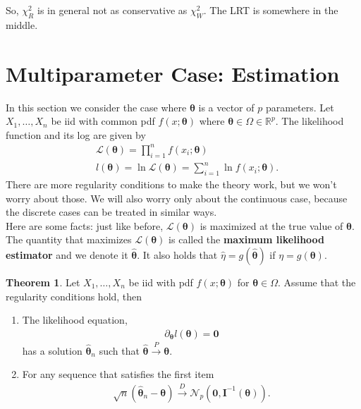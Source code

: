 \documentclass{book}
\theoremstyle{definition}
\newtheorem{thm}{Theorem}[section]
\newcommand{\p}{\partial}
\newcommand{\lag}{\mathcal{L}}
\newcommand{\N}{\mathcal{N}}
\begin{document}
So, $\chi^2_R$ is in general not as conservative as $\chi^2_W$. The LRT is somewhere in the middle. 










\section{Multiparameter Case: Estimation}


In this section we consider the case where $\bm{\theta}$ is a vector of $p$ parameters. Let $X_1,\dots, X_n$ be iid with common pdf $f(x;\bm\theta)$ where $\bm\theta \in \Omega \in \mathbb{R}^p$. The likelihood function and its log are given by
\begin{align}
&\lag(\bm\theta) = \prod^n_{i=1} f(x_i ;\bm\theta)\\
&l(\bm\theta) = \ln \lag(\bm\theta) = \sum^n_{i=1} \ln f(x_i ;\bm\theta).
\end{align}
There are more regularity conditions to make the theory work, but we won't worry about those. We will also worry only about the continuous case, because the discrete cases can be treated in similar ways. \\

Here are some facts: just like before, $\lag(\bm\theta)$ is maximized at the true value of $\bm\theta$. The quantity that maximizes $\lag(\bm\theta)$ is called the \textbf{maximum likelihood estimator} and we denote it $\hat{\bm\theta}$. It also holds that $\hat\eta = g(\hat{\bm\theta})$ if $\eta = g(\bm\theta)$. \\



\begin{thm}
	Let $X_1,\dots,X_n$ be iid with pdf $f(x;\bm\theta)$ for $\bm\theta \in \Omega$. Assume that the regularity conditions hold, then 
	\begin{enumerate}
		\item The likelihood equation, 
		\begin{align}
		\p_{\bm\theta} l(\bm\theta) = \mathbf{0}
		\end{align}
		has a solution $\hat{\bm\theta}_n$ such that $\hat{\bm\theta} \xrightarrow{P} \bm\theta$. 
		
		\item For any sequence that satisfies the first item 
		\begin{align}
		\sqrt{n} (\hat{\bm\theta}_n - \bm\theta) \xrightarrow{D} \N_p (\mathbf{0}, \mathbf{I}^{-1}(\bm\theta) ).
		\end{align}
	\end{enumerate}
\end{thm}
\end{document}
